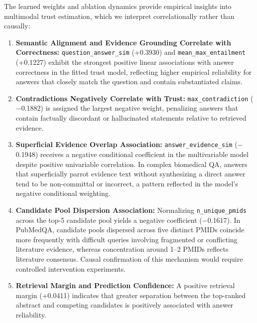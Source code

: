 \documentclass[journal,10pt]{IEEEtran}
\begin{document}
The learned weights and ablation dynamics provide empirical insights into multimodal trust estimation, which we interpret correlationally rather than causally:
\begin{enumerate}
    \item \textbf{Semantic Alignment and Evidence Grounding Correlate with Correctness:} \texttt{question\_answer\_sim} (+0.3930) and \texttt{mean\_max\_entailment} (+0.1227) exhibit the strongest positive linear associations with answer correctness in the fitted trust model, reflecting higher empirical reliability for answers that closely match the question and contain substantiated claims.
    \item \textbf{Contradictions Negatively Correlate with Trust:} \texttt{max\_contradiction} ($-$0.1882) is assigned the largest negative weight, penalizing answers that contain factually discordant or hallucinated statements relative to retrieved evidence.
    \item \textbf{Superficial Evidence Overlap Association:} \texttt{answer\_evidence\_sim} ($-$0.1948) receives a negative conditional coefficient in the multivariable model despite positive univariable correlation. In complex biomedical QA, answers that superficially parrot evidence text without synthesizing a direct answer tend to be non-committal or incorrect, a pattern reflected in the model's negative conditional weighting.
    \item \textbf{Candidate Pool Dispersion Association:} Normalizing \texttt{n\_unique\_pmids} across the top-5 candidate pool yields a negative coefficient ($-$0.1617). In PubMedQA, candidate pools dispersed across five distinct PMIDs coincide more frequently with difficult queries involving fragmented or conflicting literature evidence, whereas concentration around 1--2 PMIDs reflects literature consensus. Causal confirmation of this mechanism would require controlled intervention experiments.
    \item \textbf{Retrieval Margin and Prediction Confidence:} A positive retrieval margin (+0.0411) indicates that greater separation between the top-ranked abstract and competing candidates is positively associated with answer reliability.

\end{enumerate}
\end{document}
